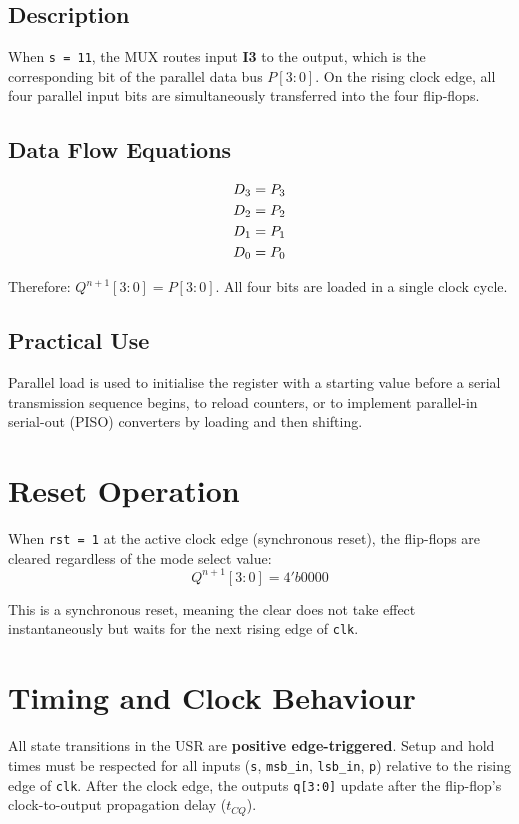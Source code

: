 \documentclass[12pt,a4paper]{report}
\newcommand{\signal}[1]{\texttt{\textcolor{codeblue}{#1}}}
\begin{document}
\subsection{Description}
When \signal{s = 11}, the MUX routes input \textbf{I3} to the output, which is the corresponding bit of the parallel data bus $P[3:0]$. On the rising clock edge, all four parallel input bits are simultaneously transferred into the four flip-flops.

\subsection{Data Flow Equations}
\begin{align}
    D_3 &= P_3 \notag \\
    D_2 &= P_2 \notag \\
    D_1 &= P_1 \notag \\
    D_0 &= P_0 \notag
\end{align}

Therefore: $Q^{n+1}[3:0] = P[3:0]$. All four bits are loaded in a single clock cycle.

\subsection{Practical Use}
Parallel load is used to initialise the register with a starting value before a serial transmission sequence begins, to reload counters, or to implement parallel-in serial-out (PISO) converters by loading and then shifting.

\section{Reset Operation}

When \signal{rst = 1} at the active clock edge (synchronous reset), the flip-flops are cleared regardless of the mode select value:
\[Q^{n+1}[3:0] = 4'b0000\]

This is a synchronous reset, meaning the clear does not take effect instantaneously but waits for the next rising edge of \signal{clk}.

\section{Timing and Clock Behaviour}

All state transitions in the USR are \textbf{positive edge-triggered}. Setup and hold times must be respected for all inputs (\signal{s}, \signal{msb\_in}, \signal{lsb\_in}, \signal{p}) relative to the rising edge of \signal{clk}. After the clock edge, the outputs \signal{q[3:0]} update after the flip-flop's clock-to-output propagation delay ($t_{CQ}$).
\end{document}

